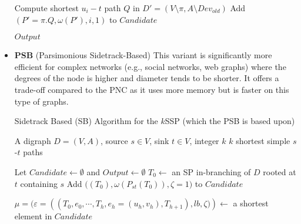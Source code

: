\begin{itemize}
\begin{algorithm}[H]
\begin{algorithmic}[1]
                  \Else
                  \State Compute shortest \( u_i-t \) path \( Q \) in \( D' = (V \setminus \pi, A \setminus Dev_{old}) \)
                  \State Add \( (P' = \pi.Q, \omega(P'), i, 1) \) to \( Candidate \)
                  \EndIf
                  \EndIf
                  \EndWhile

                  \State \Return \( Output \)
              \end{algorithmic}
          \end{algorithm}

    \item \textbf{PSB} (Parsimonious Sidetrack-Based)\cite{kSSP2023}
          This variant is significantly more efficient for complex networks
          (e.g., social networks, web graphs) where the degrees of the node is higher
          and diameter tends to be shorter. It offers a trade-off compared to the
          PNC as it uses more memory but is faster on this type of graphs.

          \begin{algorithm}[H]
              \caption{Sidetrack Based (SB) Algorithm for the \(k\)SSP (which the PSB is based upon)\cite{SB2016}}
              \begin{algorithmic}[1]
                  \Require A digraph \(D = (V, A)\), source \(s \in V\), sink \(t \in V\), integer \(k\)
                  \Ensure \(k\) shortest simple \(s\)-\(t\) paths

                  \State Let \(Candidate \gets \emptyset\) and \(Output \gets \emptyset\)
                  \State \(T_0 \gets\) an SP in-branching of \(D\) rooted at \(t\) containing \(s\)
                  \State Add \(\big((T_0), \omega(P_{st}(T_0)), \zeta = 1\big)\) to \(Candidate\)

                  \State \(\mu = \big(\varepsilon = ((T_0, e_0, \cdots, T_h, e_h = (u_h, v_h), T_{h+1}), lb, \zeta\big)) \gets\) a shortest element in \(Candidate\)


\end{algorithmic}
\end{algorithm}
\end{itemize}
